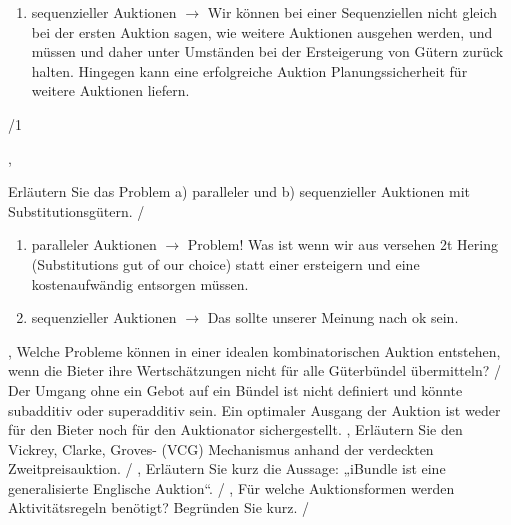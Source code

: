 \documentclass[11pt]{article}
\begin{document}
{{{\begin{enumerate}
    \item sequenzieller Auktionen $\to$ Wir können bei einer Sequenziellen nicht gleich bei der ersten Auktion sagen, wie weitere Auktionen ausgehen werden, und müssen und daher unter Umständen bei der Ersteigerung von Gütern zurück halten. Hingegen kann eine erfolgreiche Auktion Planungssicherheit für weitere Auktionen liefern.
\end{enumerate}}/1},
%
{{Erläutern Sie das Problem a) paralleler und b) sequenzieller Auktionen mit Substitutionsgütern.}
/
{\begin{enumerate}
    \item paralleler Auktionen $\to$ Problem! Was ist wenn wir aus versehen 2t Hering (Substitutions gut of our choice) statt einer ersteigern und eine kostenaufwändig entsorgen müssen.
    \item sequenzieller Auktionen $\to$ Das sollte unserer Meinung nach ok sein.
\end{enumerate}}},
%
{{Welche Probleme können in einer idealen kombinatorischen Auktion entstehen, wenn die Bieter ihre Wertschätzungen nicht für alle Güterbündel übermitteln?}
/
{
Der Umgang ohne ein Gebot auf ein Bündel ist nicht definiert und könnte subadditiv oder superadditiv sein. Ein optimaler Ausgang der Auktion ist weder für den Bieter noch für den Auktionator sichergestellt. }},
%
{{Erläutern Sie den Vickrey, Clarke, Groves- (VCG) Mechanismus anhand der verdeckten Zweitpreisauktion.}
/
{
\todo}},
%
{{Erläutern Sie kurz die Aussage: „iBundle ist eine generalisierte Englische Auktion“.}
/
{
\todo}},
%
{{Für welche Auktionsformen werden Aktivitätsregeln benötigt? Begründen Sie kurz.}
/
{
\todo}}
}



\end{document}
